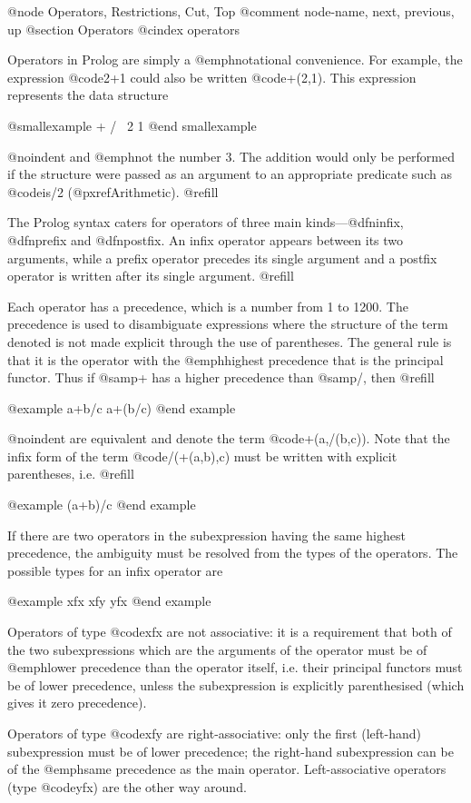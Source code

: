 {@node Operators, Restrictions, Cut, Top
@comment  node-name,  next,  previous,  up
@section Operators
@cindex operators

Operators in Prolog are simply a @emph{notational convenience}.  For
example, the expression @code{2+1} could also be written @code{+(2,1)}.
This expression represents the data structure

@smallexample
   +
 /   \
2     1
@end smallexample

@noindent
and @emph{not} the number 3.  The addition would only be performed if the
structure were passed as an argument to an appropriate predicate such as
@code{is/2} (@pxref{Arithmetic}). @refill

The Prolog syntax caters for operators of three main kinds---@dfn{infix},
@dfn{prefix} and @dfn{postfix}.  An infix operator appears between its two
arguments, while a prefix operator precedes its single argument and a
postfix operator is written after its single argument. @refill

Each operator has a precedence, which is a number from 1 to 1200.  The
precedence is used to disambiguate expressions where the structure of
the term denoted is not made explicit through the use of parentheses.
The general rule is that it is the operator with the @emph{highest}
precedence that is the principal functor.  Thus if @samp{+} has a higher
precedence than @samp{/}, then @refill

@example
a+b/c     a+(b/c)
@end example

@noindent
are equivalent and denote the term @code{+(a,/(b,c))}.  Note that the
infix form of the term @code{/(+(a,b),c)} must be written with explicit
parentheses, i.e. @refill

@example
(a+b)/c
@end example

If there are two operators in the subexpression having the same highest
precedence, the ambiguity must be resolved from the types of the
operators.  The possible types for an infix operator are

@example
xfx     xfy     yfx
@end example

Operators of type @code{xfx} are not associative: it is a requirement
that both of the two subexpressions which are the arguments of the
operator must be of @emph{lower} precedence than the operator itself,
i.e. their principal functors must be of lower precedence, unless the
subexpression is explicitly parenthesised (which gives it zero
precedence).

Operators of type @code{xfy} are right-associative: only the first
(left-hand) subexpression must be of lower precedence; the right-hand
subexpression can be of the @emph{same} precedence as the main operator.
Left-associative operators (type @code{yfx}) are the other way around.

}
